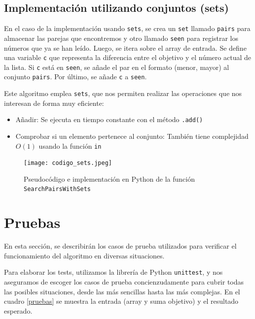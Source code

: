 \documentclass[a4paper, titlepage]{article}
\begin{document}
\subsection{Implementación utilizando conjuntos (sets)}

En el caso de la implementación usando \texttt{sets}, se crea un \texttt{set} llamado \texttt{pairs} para almacenar las parejas que encontremos y otro llamado \texttt{seen} para registrar los números que ya se han leído. Luego, se itera sobre el array de entrada. Se define una variable \texttt{c} que representa la diferencia entre el objetivo y el número actual de la lista. Si \texttt{c} está en \texttt{seen}, se añade el par en el formato (menor, mayor) al conjunto \texttt{pairs}. Por último, se añade \texttt{c} a \texttt{seen}.

Este algoritmo emplea \texttt{sets}, que nos permiten realizar las operaciones que nos interesan de forma muy eficiente:

\begin{itemize}

\item{Añadir: Se ejecuta en tiempo constante con el método \texttt{.add()}}

\item{Comprobar si un elemento pertenece al conjunto: También tiene complejidad $O(1)$ usando la función \texttt{in}}

\end{itemize}


\begin{figure}[h]


\texttt{[image: codigo\_sets.jpeg]}

\caption{Pseudocódigo e implementación en Python de la función \texttt{SearchPairsWithSets}}
\label{codigosets}


\end{figure}


\section{Pruebas}
En esta sección, se describirán los casos de prueba utilizados para verificar el funcionamiento del algoritmo en diversas situaciones.

Para elaborar los tests, utilizamos la librería de Python \texttt{unittest}, y nos aseguramos de escoger los casos de prueba concienzudamente para cubrir todas las posibles situaciones, desde las más sencillas hasta las más complejas. En el cuadro \ref{pruebas} se muestra la entrada (array y suma objetivo) y el resultado esperado.
\end{document}
